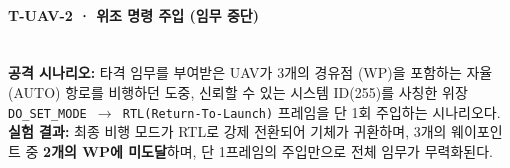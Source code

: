 \paragraph{\textbf{T-UAV-2 · 위조 명령 주입 (임무 중단)}} ~\\
\textbf{공격 시나리오:} 
타격 임무를 부여받은 UAV가 3개의 경유점 (WP)을 포함하는 자율 (AUTO) 항로를 비행하던 도중, 신뢰할 수 있는 시스템 ID(255)를 사칭한 위장 \texttt{DO\_SET\_MODE $\to$ RTL(Return-To-Launch)} 프레임을 단 1회 주입하는 시나리오다.
\\
\textbf{실험 결과:} 최종 비행 모드가 RTL로 강제 전환되어 기체가 귀환하며, 3개의 웨이포인트 중 \textbf{2개의 WP에 미도달}하며, 단 1프레임의 주입만으로 전체 임무가 무력화된다.\\
